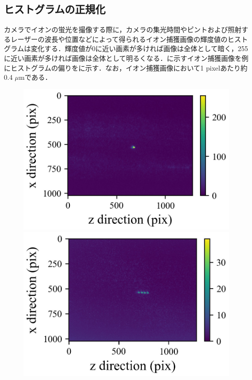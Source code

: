 \subsection{ヒストグラムの正規化}
カメラでイオンの蛍光を撮像する際に，カメラの集光時間やピントおよび照射するレーザーの波長や位置などによって得られるイオン捕獲画像の輝度値のヒストグラムは変化する．輝度値が0に近い画素が多ければ画像は全体として暗く，255に近い画素が多ければ画像は全体として明るくなる．に示すイオン捕獲画像を例にヒストグラムの偏りをに示す．なお，イオン捕獲画像において1 pixelあたり約0.4 $\mu$mである．
\begin{figure}[h]
	\begin{center}
	\begin{minipage}{0.3\linewidth}
		\includegraphics[width=0.98\columnwidth]{./theory/figure/5/image_0.jpg}
	\end{minipage}
	\begin{minipage}{0.3\linewidth}
		\includegraphics[width=0.98\columnwidth]{./theory/figure/5/image_1.jpg}

\end{minipage}
\end{center}
\end{figure}
